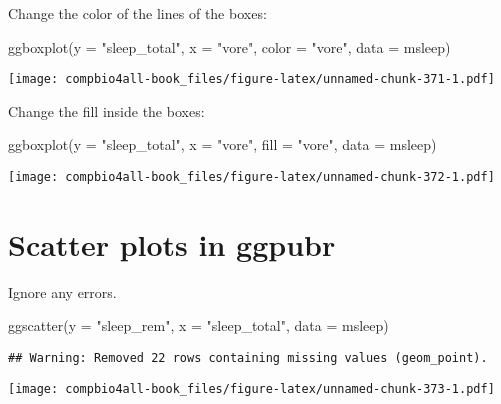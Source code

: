 \documentclass[
]{book}
\newenvironment{Shaded}{\begin{snugshade}}{\end{snugshade}}
\newcommand{\AttributeTok}[1]{\textcolor[rgb]{0.77,0.63,0.00}{#1}}
\newcommand{\FunctionTok}[1]{\textcolor[rgb]{0.00,0.00,0.00}{#1}}
\newcommand{\NormalTok}[1]{#1}
\newcommand{\StringTok}[1]{\textcolor[rgb]{0.31,0.60,0.02}{#1}}
\begin{document}
Change the color of the lines of the boxes:

\begin{Shaded}
\begin{Highlighting}[]
\FunctionTok{ggboxplot}\NormalTok{(}\AttributeTok{y =} \StringTok{"sleep\_total"}\NormalTok{,}
          \AttributeTok{x =} \StringTok{"vore"}\NormalTok{,}
          \AttributeTok{color =} \StringTok{"vore"}\NormalTok{,}
          \AttributeTok{data =}\NormalTok{ msleep)}
\end{Highlighting}
\end{Shaded}

\texttt{[image: compbio4all-book\_files/figure-latex/unnamed-chunk-371-1.pdf]}

Change the fill inside the boxes:

\begin{Shaded}
\begin{Highlighting}[]
\FunctionTok{ggboxplot}\NormalTok{(}\AttributeTok{y =} \StringTok{"sleep\_total"}\NormalTok{,}
          \AttributeTok{x =} \StringTok{"vore"}\NormalTok{,}
          \AttributeTok{fill =} \StringTok{"vore"}\NormalTok{,}
          \AttributeTok{data =}\NormalTok{ msleep)}
\end{Highlighting}
\end{Shaded}

\texttt{[image: compbio4all-book\_files/figure-latex/unnamed-chunk-372-1.pdf]}

\hypertarget{scatter-plots-in-ggpubr-2}{%
\section{Scatter plots in ggpubr}\label{scatter-plots-in-ggpubr-2}}

Ignore any errors.

\begin{Shaded}
\begin{Highlighting}[]
\FunctionTok{ggscatter}\NormalTok{(}\AttributeTok{y =} \StringTok{"sleep\_rem"}\NormalTok{,}
          \AttributeTok{x =} \StringTok{"sleep\_total"}\NormalTok{,}
          \AttributeTok{data =}\NormalTok{ msleep)}
\end{Highlighting}
\end{Shaded}

\begin{verbatim}
## Warning: Removed 22 rows containing missing values (geom_point).
\end{verbatim}

\texttt{[image: compbio4all-book\_files/figure-latex/unnamed-chunk-373-1.pdf]}
\end{document}
